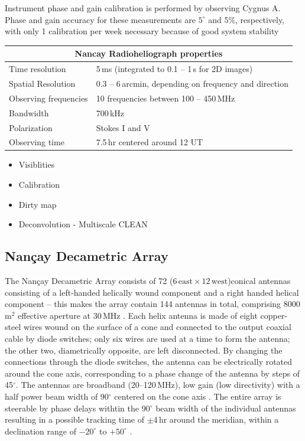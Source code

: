 Instrument phase and gain calibration is performed by observing Cygnus A. Phase and gain accuracy for these measurements are $5^{\circ}$ and 5\%, respectively, with only 1 calibration per week necessary because of good system stability \citep{avignon1989}

\begin{tabular}{ |l|l| }
  \hline
  \multicolumn{2}{|c|}{Nancay Radioheliograph properties} \\
  \hline
  Time resolution & 5\,ms (integrated to 0.1 -- 1\,s for 2D images) \\
  Spatial Resolution & 0.3 -- 6\,arcmin, depending on frequency and direction \\
  Observing frequencies & 10 frequencies between 100 -- 450\,MHz \\
  Bandwidth & 700\,kHz \\
  Polarization & Stokes I and V \\
  Observing time & 7.5\,hr centered around 12 UT \\
  \hline
\end{tabular}

\begin{itemize}
\item Visiblities
\item Calibration
\item Dirty map
\item Deconvolution - Multiscale CLEAN
\end{itemize}

\subsection{Nan\c{c}ay Decametric Array}\label{sec:32}

The Nan\c{c}ay Decametric Array consists of 72 ($6\,\mathrm{east} \times12\,\mathrm{west}$)conical antennas consisting of a left-handed helically wound component and a right handed helical component -- this makes the array contain 144 antennas in total, comprising 8000\,m$^2$ effective aperture at 30\,MHz \citep{lecacheux2000}. Each helix antenna is made of eight copper-steel wires wound on the surface of a cone and connected to the output coaxial cable by diode switches; only six wires are used at a time to form the antenna; the other two, diametrically opposite, are left disconnected. By changing the connections through the diode switches, the antenna can be electrically rotated around the cone axis, corresponding to a phase change of the antenna by steps of 45$^{\circ}$. The antennas are broadband (20--120\,MHz), low gain (low directivity) with a half power beam width of 90$^{\circ}$ centered on the cone axis \citep{boischot1980}. The entire array is steerable by phase delays withtin the 90$^{\circ}$  beam width of the individual antennas resulting in a possible tracking time of $\pm$4\,hr around the meridian, within a declination range of $-20^{\circ}$ to $+50^{\circ}$ .

